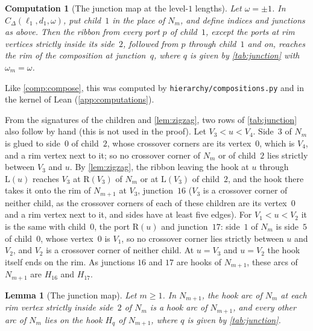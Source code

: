\documentclass[11pt]{amsart}
\newtheorem{lemma}[theorem]{Lemma}
\newtheorem{computation}[theorem]{Computation}
\theoremstyle{definition}
\theoremstyle{remark}
\newcommand{\Lp}{\mathrm L}
\newcommand{\Rp}{\mathrm R}
\newcommand{\code}[1]{\texttt{#1}}
\begin{document}
\begin{computation}[The junction map at the level-$1$ lengths]\label{comp:junction}
Let $\omega=\pm1$. In $C_\Delta(\ell_1,d_1,\omega)$, put child~$1$ in the place of $N_m$, and define indices and
junctions as above. Then the ribbon from every port $p$ of child~$1$, except the ports at rim vertices strictly inside its
side~$2$, followed from $p$ through child~$1$ and on, reaches the rim of the composition at junction~$q$, where $q$ is given by \cref{tab:junction} with
$\omega_m=\omega$.
\end{computation}

Like \cref{comp:compose}, this was computed by \code{hierarchy/compositions.py} and in the kernel of Lean
(\cref{app:computations}).

From the signatures of the children and \cref{lem:zigzag}, two rows of \cref{tab:junction} also follow by hand (this is
not used in the proof). Let $V_3<u<V_4$. Side~$3$ of $N_m$ is glued to side~$0$ of child~$2$, whose crossover corners
are its vertex~$0$, which is $V_4$, and a rim vertex next to it; so no crossover corner of $N_m$ or of child~$2$ lies
strictly between $V_3$ and $u$. By \cref{lem:zigzag}, the ribbon leaving the hook at $u$ through $\Lp(u)$ reaches $V_3$
at $\Rp(V_3)$ of $N_m$ or at $\Lp(V_3)$ of child~$2$, and the hook there takes it onto the rim of $N_{m+1}$ at $V_3$,
junction~$16$ ($V_3$ is a crossover corner of neither child, as the crossover corners of each of these children are its
vertex~$0$ and a rim vertex next to it, and sides have at least five edges). For $V_1<u<V_2$ it is the same with child~$0$, the port
$\Rp(u)$ and junction~$17$: side~$1$ of $N_m$ is side~$5$ of child~$0$, whose vertex~$0$ is $V_1$, so no crossover
corner lies strictly between $u$ and $V_2$, and $V_2$ is a crossover corner of neither child. At $u=V_3$ and $u=V_2$
the hook itself ends on the rim. As junctions $16$ and $17$ are hooks of $N_{m+1}$, these arcs of $N_{m+1}$
are $H_{16}$ and $H_{17}$.

\begin{lemma}[The junction map]\label{lem:junctionmap}
Let $m\ge1$. In $N_{m+1}$, the hook arc of $N_m$ at each rim vertex strictly inside side~$2$ of $N_m$ is a hook arc
of $N_{m+1}$, and every other arc of $N_m$ lies on the hook $H_q$ of $N_{m+1}$, where $q$ is given by
\cref{tab:junction}.
\end{lemma}
\end{document}
